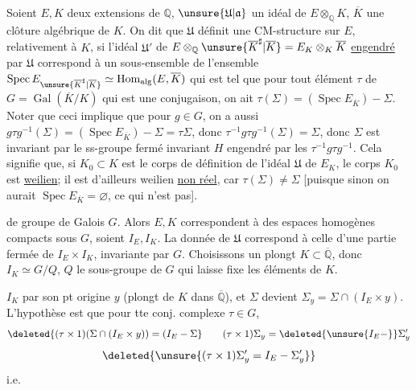 Soient $E,K$ deux extensions de $\mathbb Q$, \deleted{$\unsure{\Sigma}$}
$\unsure{\mathfrak U|\mathfrak a}$ un idéal de $E\otimes_{\mathbb Q}K$,
 $\overline K$ une clôture algébrique de $K$.
On dit que $\mathfrak U$ définit une CM-structure sur $E$, relativement à $K$,
si l'idéal $\mathfrak U'$ de
$E\otimes_{\mathbb Q}\unsure{\overline K^{\sharp}|\overline K}=E_K\otimes_K\overline K$
\uline{engendré} par $\mathfrak U$ correspond à un sous-ensemble \inserted{$\Sigma$}
de l'ensemble  
$\operatorname{Spec}E_{\unsure{\overline K^{\sharp}|\overline K}}
\simeq\operatorname{Hom}_{\mathrm{alg}}(E,\overline K)$ qui est tel que pour tout
élément $\tau$ de $G=\operatorname{Gal}(\overline K/K)$ qui est une conjugaison,
on ait $\tau(\Sigma)=(\operatorname{Spec}E_{\overline K})-\Sigma$.
Noter que ceci implique que pour $g\in G$, on a aussi
$g\tau g^{-1}(\Sigma)=(\operatorname{Spec}E_{\overline K})-\Sigma=\tau\Sigma$,
donc $\tau^{-1}g\tau g^{-1}(\Sigma)=\Sigma$, donc $\Sigma$ est invariant
 par le ss-groupe  fermé invariant $H$
engendré par les $\tau^{-1}g\tau g^{-1}$.
Cela signifie que, si $K_0\subset K$ est le corps de définition de l'idéal
$\mathfrak U$ de $E_K$, le corps $K_0$  est \uline{weilien};
 il est d'ailleurs weilien \uline{non réel}, car $\tau(\Sigma)\ne\Sigma$
[puisque sinon on aurait $\operatorname{Spec}E_{\overline K}=\varnothing$, ce qui n'est pas].

 de groupe de Galois $G$.
Alors $E,K$ correspondent à des espaces homogènes compacts sous $G$, soient $I_E,I_K$.
La donnée de $\mathfrak U$ correspond à celle d'une partie fermée de $I_E\times I_K$,
invariante par $G$. Choisissons un plongt $K\subset\overline{\mathbb Q}$,
donc $I_K\simeq G/Q$, $Q$ le sous-groupe de $G$ qui laisse fixe les éléments de $K$.

 
$I_K$ par son pt origine $y$  (plongt de $K$ dans $\overline{\mathbb Q}$),
et $\Sigma$ devient $\Sigma_y=\Sigma\cap(I_E\times y)$.
L'hypothèse est que pour tte conj. complexe $\tau\in G$,
\[
\deleted{(\tau\times1)(\Sigma\cap(I_E\times y))=(I_E-\Sigma}
\qquad
(\tau\times1)\Sigma_y=\deleted{\unsure{I_E-}}\Sigma'_y
\]
\[
\deleted{\unsure{(\tau\times1)\Sigma'_y=I_E-\Sigma'_y}}
\]
i.e.
